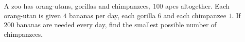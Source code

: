 A zoo has orang-utans, gorillas and chimpanzees, $100$ apes altogether. Each orang-utan is given $4$ bananas per day, each gorilla $6$ and each chimpanzee $1$. If $200$ bananas are needed every day, find the smallest possible number of chimpanzees.
